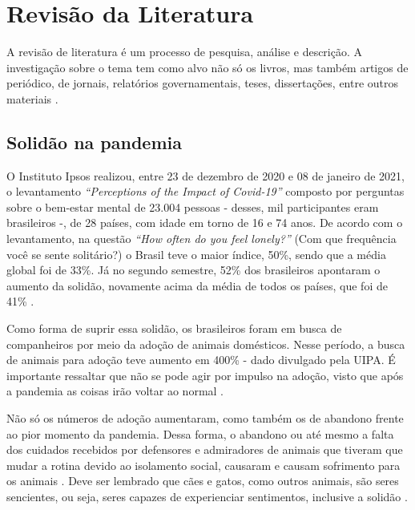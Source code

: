 \chapter{Revisão da Literatura}
\label{revisao-literatura}

A revisão de literatura é um processo de pesquisa, análise e descrição. A investigação sobre o tema tem como alvo não só os livros, mas também artigos de periódico, de jornais, relatórios governamentais, teses, dissertações, entre outros materiais \cite{revisao}.


\section{Solidão na pandemia}
O Instituto Ipsos realizou, entre 23 de dezembro de 2020 e 08 de janeiro de 2021, o levantamento \textit{“Perceptions of the Impact of Covid-19”} composto por perguntas sobre o bem-estar mental de 23.004 pessoas - desses, mil participantes eram brasileiros -, de 28 países, com idade em torno de 16 e 74 anos. De acordo com o levantamento, na questão \textit{“How often do you feel lonely?”} (Com que frequência você se sente solitário?) o Brasil teve o maior índice, 50\%, sendo que a média global foi de 33\%. Já no segundo semestre, 52\% dos brasileiros apontaram o aumento da solidão, novamente acima da média de todos os países, que foi de 41\% \cite{solidaoIPSOS}.

Como forma de suprir essa solidão, os brasileiros foram em busca de companheiros por meio da adoção de animais domésticos. Nesse período, a busca de animais para adoção teve aumento em 400\% - dado divulgado pela \ac {UIPA}. É importante ressaltar que não se pode agir por impulso na adoção, visto que após a pandemia as coisas irão voltar ao normal \cite{usp}. 

Não só os números de adoção aumentaram, como também os de abandono frente ao pior momento da pandemia. Dessa forma, o abandono ou até mesmo a falta dos cuidados recebidos por defensores e admiradores de animais que tiveram que mudar a rotina devido ao isolamento social, causaram e causam sofrimento para os animais \cite[p. 34-35]{isolamento-animais}. Deve ser lembrado que cães e gatos, como outros animais, são seres sencientes, ou seja, seres capazes de experienciar sentimentos, inclusive a solidão \cite{seres}.

